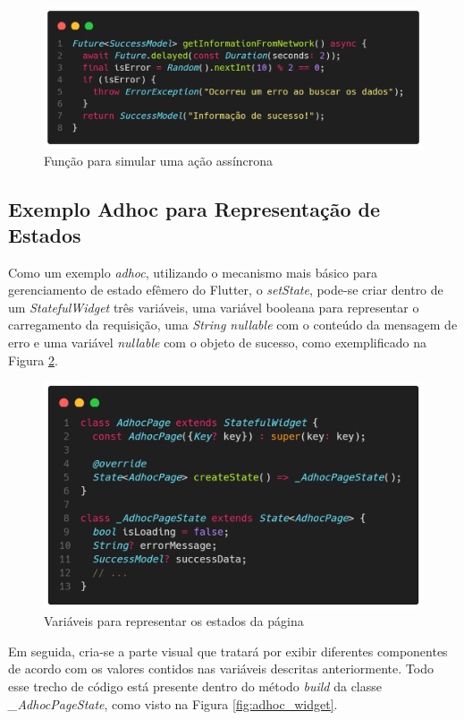 \documentclass[12pt, %
openright, 
oneside, %
a4paper,    %
brazil]{facom-ufu-abntex2}
\begin{document}
\begin{figure}[ht]
    \centering
    \includegraphics[width=.65\textwidth, trim={0 30 0 100}, clip]{figures/states/getInformationFromNetwork.png}
    \caption{Função para simular uma ação assíncrona}
    \label{fig:simulate_request}
\end{figure}

\subsection{Exemplo Adhoc para Representação de Estados}

Como um exemplo \textit{adhoc}, utilizando o mecanismo mais básico para gerenciamento de estado efêmero do Flutter, o \textit{setState}, pode-se criar dentro de um \textit{StatefulWidget} três variáveis, uma variável booleana para representar o carregamento da requisição, uma \textit{String nullable} com o conteúdo da mensagem de erro e uma variável \textit{nullable} com o objeto de sucesso, como exemplificado na Figura \ref{fig:variables}.

\begin{figure}[ht]
    \centering
    \includegraphics[width=.65\textwidth, trim={0 30 0 100}, clip]{figures/states/variables.png}
    \caption{Variáveis para representar os estados da página}
    \label{fig:variables}
\end{figure}

Em seguida, cria-se a parte visual que tratará por exibir diferentes componentes de acordo com os valores contidos nas variáveis descritas anteriormente. Todo esse trecho de código está presente dentro do método \textit{build} da classe \textit{\_AdhocPageState}, como visto na Figura \ref{fig:adhoc_widget}.
\end{document}

